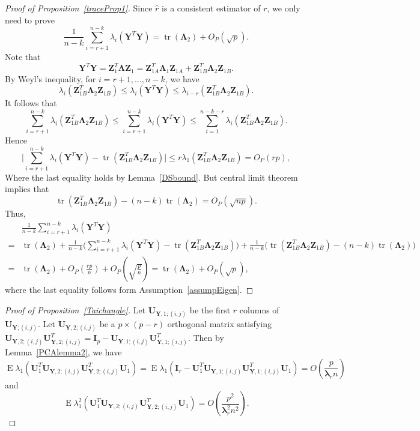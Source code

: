 \documentclass[12pt]{article} %
\DeclareMathOperator{\mytr}{tr}
\DeclareMathOperator{\myE}{E}
\newcommand{\bZ}{\mathbf{Z}}
\newcommand{\bY}{\mathbf{Y}}
\newcommand{\bI}{\mathbf{I}}
\newcommand{\bU}{\mathbf{U}}
\newcommand{\bfsym}[1]{\ensuremath{\boldsymbol{#1}}}
\def\blambda {\bfsym {\lambda}}
\def\bLambda {\bfsym {\Lambda}}
\theoremstyle{definition}
\begin{document}
\begin{appendices}
\begin{proof}[Proof of Proposition~\ref{traceProp1}]
    Since $\hat{r}$ is a consistent estimator of $r$, we only need to prove
    $$
    \frac{1 }{n-k}
        \sum_{i=r+1}^{n-k}\lambda_i(\bY^T\bY)
        =\mytr(\bLambda_2)+O_P(\sqrt{p}).
    $$
    Note that
$$
\bY^T \bY =\bZ_1^T \bLambda \bZ_1
=
\bZ_{1A}^T \bLambda_1 \bZ_{1A}+
\bZ_{1B}^T \bLambda_2 \bZ_{1B}.
$$
By Weyl's inequality, for $i=r+1,\ldots, n-k$, we have
$$
\lambda_{i}(\bZ_{1B}^T \bLambda_2 \bZ_{1B})\leq \lambda_i(\bY^T \bY)\leq \lambda_{i-r}(\bZ_{1B}^T \bLambda_2 \bZ_{1B}).
$$
It follows that
$$
\sum_{i=r+1}^{n-k}\lambda_{i}(\bZ_{1B}^T \bLambda_2 \bZ_{1B})\leq \sum_{i=r+1}^{n-k}\lambda_i(\bY^T \bY)\leq \sum_{i=1}^{n-k-r}\lambda_{i}(\bZ_{1B}^T \bLambda_2 \bZ_{1B}).
$$
Hence
$$
 \big|\sum_{i=r+1}^{n-k}\lambda_i(\bY^T \bY)- \mytr(\bZ_{1B}^T \bLambda_2 \bZ_{1B})\big|\leq r \lambda_1(\bZ_{1B}^T \bLambda_2 \bZ_{1B})=O_P(rp),
$$
    Where the last equality holds by Lemma~\ref{DSbound}.
But central limit theorem implies that
$$\mytr(\bZ_{1B}^T \bLambda_2 \bZ_{1B})-(n-k)\mytr(\bLambda_2)%
=O_P(\sqrt{np}).$$
Thus,
$$
    \begin{aligned}
        &\frac{1}{n-k}\sum_{i=r+1}^{n-k}\lambda_i (\bY^T \bY)\\
        =&\mytr(\bLambda_2)+
        \frac{1}{n-k}\big(\sum_{i=r+1}^{n-k}\lambda_i(\bY^T \bY)-\mytr(\bZ_{1B}^T \bLambda_2 \bZ_{1B})\big) +\frac{1}{n-k}\big(\mytr(\bZ_{1B}^T \bLambda_2 \bZ_{1B})-(n-k)\mytr(\bLambda_2)\big)\\
        =&\mytr(\bLambda_2)+O_P(\frac{rp}{n})+O_P(\sqrt{\frac{p}{n}})
        =\mytr(\bLambda_2)+O_P(\sqrt{p}),
    \end{aligned}
$$
    where the last equality follows form Assumption~\ref{assumpEigen}.
\end{proof}

    \begin{proof}[Proof of Proposition~\ref{Taichangle}]
        Let $\bU_{\bY,1;(i,j)}$ be the first $r$ columns of $\bU_{\bY;(i,j)}$.
        Let $\bU_{\bY,2;(i,j)}$ be a $p\times (p-r)$ orthogonal matrix satisfying $\bU_{\bY,2;(i,j)}\bU_{\bY,2;(i,j)}^T= \bI_p-\bU_{\bY,1;(i,j)}\bU_{\bY,1;(i,j)}^T$.
        Then by Lemma~\ref{PCAlemma2}, we have
        $$
        \myE\lambda_1(\bU_1^T \bU_{\bY,2;(i,j)}\bU_{\bY,2;(i,j)}^T \bU_1)
        =
        \myE\lambda_1(\bI_r-\bU_1^T \bU_{\bY,1;(i,j)}\bU_{\bY,1;(i,j)}^T \bU_1)
        =
        O(\frac{p}{\blambda_r n})
        $$
        and
        $$
        \myE\lambda_1^2(\bU_1^T \bU_{\bY,2;(i,j)}\bU_{\bY,2;(i,j)}^T \bU_1)
        =
        O(\frac{p^2}{\blambda_r^2 n^2}).
        $$



\end{proof}
\end{appendices}
\end{document}
